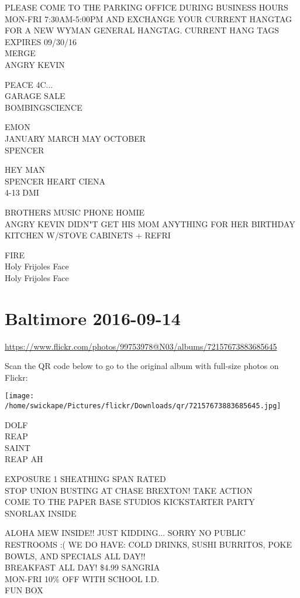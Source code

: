 \documentclass[10pt,letterpaper]{article}
\begin{document}
PLEASE COME TO THE PARKING OFFICE DURING BUSINESS HOURS MON{-}FRI 7:30AM{-}5:00PM AND EXCHANGE YOUR CURRENT HANGTAG FOR A NEW WYMAN GENERAL HANGTAG.  CURRENT HANG TAGS EXPIRES 09/30/16\\
MERGE\\
ANGRY KEVIN

PEACE 4C...\\
GARAGE SALE\\
BOMBINGSCIENCE

EMON\\
JANUARY MARCH MAY OCTOBER\\
SPENCER

HEY MAN\\
SPENCER HEART CIENA\\
4{-}13 DMI

BROTHERS MUSIC PHONE HOMIE\\
ANGRY KEVIN DIDN"T GET HIS MOM ANYTHING FOR HER BIRTHDAY\\
KITCHEN W/STOVE CABINETS + REFRI

FIRE\\
Holy Frijoles Face\\
Holy Frijoles Face
\pagebreak

\section*{Baltimore 2016-09-14}

\url{https://www.flickr.com/photos/99753978@N03/albums/72157673883685645}

Scan the QR code below to go to the original album with full-size photos on Flickr:

\texttt{[image: /home/swickape/Pictures/flickr/Downloads/qr/72157673883685645.jpg]}
\pagebreak

DOLF\\
REAP\\
SAINT\\
REAP AH

EXPOSURE 1 SHEATHING SPAN RATED\\
STOP UNION BUSTING AT CHASE BREXTON!   TAKE ACTION\\
COME TO THE PAPER BASE STUDIOS KICKSTARTER PARTY\\
SNORLAX INSIDE

ALOHA MEW INSIDE!! JUST KIDDING...  SORRY NO PUBLIC RESTROOMS :( WE DO HAVE: COLD DRINKS, SUSHI BURRITOS, POKE BOWLS, AND SPECIALS ALL DAY!!\\
BREAKFAST ALL DAY!  \$4.99 SANGRIA\\
MON{-}FRI 10\% OFF WITH SCHOOL I.D.\\
FUN BOX
\end{document}
